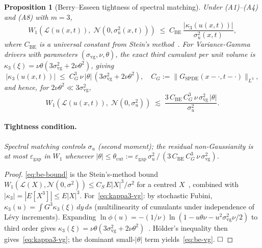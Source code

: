 \documentclass[review,12pt]{elsarticle}
\newtheorem{proposition}{Proposition}
\begin{document}
\begin{proposition}[Berry--Esseen tightness of spectral matching]
\label{cor:berry-esseen}
Under (A1)--(A4) and (A8) with $m=3$,
\begin{equation}
\label{eq:be-bound}
W_1\!\left(\mathcal{L}(u(x,t)),\;\mathcal{N}(0,\sigma_u^2(x,t))\right)
\;\le\;
C_{\mathrm{BE}}\,\frac{|\kappa_3(u(x,t))|}{\sigma_u^2(x,t)},
\end{equation}
where $C_{\mathrm{BE}}$ is a universal constant from Stein's
method~\cite{ChenGoldsteinShao2011}. For Variance-Gamma drivers with
parameters $(\sigma_{\mathrm{vg}},\nu,\theta)$, the exact third cumulant
per unit volume is $\kappa_3(\xi)=\nu\theta(3\sigma_{\mathrm{vg}}^2+2\nu\theta^2)$,
giving
\begin{equation}
\label{eq:kappa3-vg}
|\kappa_3(u(x,t))|\;\le\;
C_G^3\,\nu\,|\theta|\,(3\sigma_{\mathrm{vg}}^2+2\nu\theta^2),\quad
C_G:=\|G_{\mathrm{SPDE}}(x-\cdot,t-\cdot)\|_{L^3},
\end{equation}
and hence, for $2\nu\theta^2\ll 3\sigma_{\mathrm{vg}}^2$,
\begin{equation}
\label{eq:be-vg}
W_1\!\left(\mathcal{L}(u(x,t)),\;\mathcal{N}(0,\sigma_u^2)\right)
\;\lesssim\;
\frac{3\,C_{\mathrm{BE}}\,C_G^3\,\nu\,\sigma_{\mathrm{vg}}^2\,|\theta|}{\sigma_u^2}.
\end{equation}
\paragraph{Tightness condition.} Spectral matching controls $\sigma_u$
(second moment); the residual non-Gaussianity is at most
$\varepsilon_{\mathrm{gap}}$ in $W_1$ whenever
$|\theta|\le\theta_{\mathrm{cut}}:=
\varepsilon_{\mathrm{gap}}\,\sigma_u^2\,/\,
(3\,C_{\mathrm{BE}}\,C_G^3\,\nu\,\sigma_{\mathrm{vg}}^2)$.
\end{proposition}

\begin{proof}
\eqref{eq:be-bound} is the Stein's-method bound
$W_1(\mathcal{L}(X),\mathcal{N}(0,\sigma^2))\le C_S\,E|X|^3/\sigma^2$
for a centred $X$~\cite[Thm.~3.1]{ChenGoldsteinShao2011},
combined with $|\kappa_3|=|E[X^3]|\le E|X|^3$.
For~\eqref{eq:kappa3-vg}: by stochastic Fubini,
$\kappa_3(u)=\int G^3\kappa_3(\xi)\,dy\,ds$
(multilinearity of cumulants under independence of Lévy increments).
Expanding $\ln\phi(u)=-(1/\nu)\ln(1-u\theta\nu-u^2\sigma_{\mathrm{vg}}^2\nu/2)$
to third order gives $\kappa_3(\xi)=\nu\theta(3\sigma_{\mathrm{vg}}^2+2\nu\theta^2)$~\cite{ContTankov2003,MadanCarrChang1998}.
H\"older's inequality then gives~\eqref{eq:kappa3-vg}; the dominant small-$|\theta|$
term yields~\eqref{eq:be-vg}.
$\hfill\square$
\end{proof}
\end{document}
